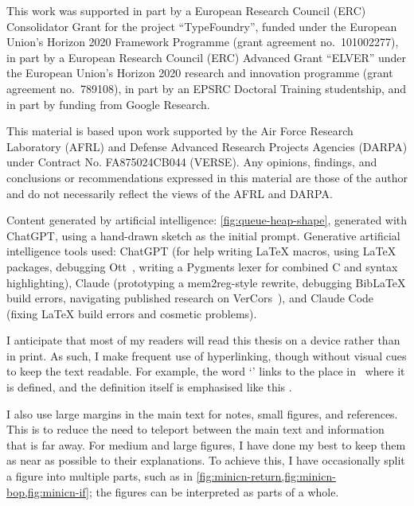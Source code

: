This work was supported
in part by a European Research Council (ERC) Consolidator Grant for the project
``TypeFoundry'', funded under the European Union's Horizon 2020 Framework
Programme (grant agreement no.\ 101002277),
in part by a European Research Council (ERC) Advanced Grant ``ELVER'' under the
European Union's Horizon 2020 research and innovation programme (grant agreement no.\ 789108),
in part by an EPSRC Doctoral Training studentship, and in
part by funding from Google Research.

This material is based upon work supported by the Air Force Research Laboratory
(AFRL) and Defense Advanced Research Projects Agencies (DARPA) under Contract
No. FA8750\textendash{}24\textendash{}C\textendash{}B044 (VERSE). Any opinions,
findings, and conclusions or recommendations expressed in this material are
those of the author and do not necessarily reflect the views of the AFRL and
DARPA.%

Content generated by artificial intelligence: \cref{fig:queue-heap-shape},
generated with ChatGPT, using a hand-drawn sketch as the initial prompt.
Generative artificial intelligence tools used: ChatGPT (for help writing
\LaTeX{} macros, using \LaTeX{} packages, debugging Ott~\cite{sewell2010ott},
writing a Pygments lexer for combined C and  syntax
highlighting), Claude (prototyping a mem2reg-style  rewrite, debugging
BibLaTeX build errors, navigating published research on
VerCors~\cite{blom2017vercors}), and Claude Code (fixing \LaTeX{} build errors
and cosmetic problems).

%

I anticipate that most of my readers will read this thesis on a device rather
than in print. As such, I make frequent use of hyperlinking, though without
visual cues to keep the text readable. For example, the word
`' links to the place in~
where it is defined, and the definition itself is emphasised like this
.

I also use large margins in the main text for notes, small figures, and
references. This is to reduce the need to teleport between the main text and
information that is far away.
For medium and large figures, I have done my best to keep them as near as
possible to their explanations. To achieve this, I have occasionally split a
figure into multiple parts, such as in
\cref{fig:minicn-return,fig:minicn-bop,fig:minicn-if}; the figures can be
interpreted as parts of a whole.

